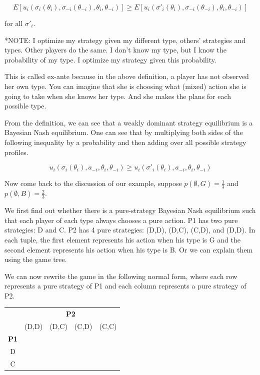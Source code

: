 \documentclass[12pt, oneside]{article}
\begin{document}
\[
E[u_i(\sigma_i(\theta_i), \sigma_{-i}(\theta_{-i}), \theta_i, \theta_{-i})] \geq E[u_i(\sigma'_i(\theta_i), \sigma_{-i}(\theta_{-i}), \theta_i, \theta_{-i})]
\]

for all \( \sigma'_i \).

*NOTE: I optimize my strategy given my different type, others' strategies and types. Other players do the same. I don't know my type, but I know the probability of my type. I optimize my strategy given this probability.

This is called ex-ante because in the above definition, a player has not observed her own type. You can imagine that she is choosing what (mixed) action she is going to take when she knows her type. And she makes the plans for each possible type.

From the definition, we can see that a weakly dominant strategy equilibrium is a Bayesian Nash equilibrium. One can see that by multiplying both sides of the following inequality by a probability and then adding over all possible strategy profiles.

\[
u_i(\sigma_i(\theta_i), a_{-i}, \theta_i, \theta_{-i}) \geq u_i(\sigma'_i(\theta_i), a_{-i}, \theta_i, \theta_{-i})
\]

Now come back to the discussion of our example, suppose \( p(\emptyset, G) = \frac{1}{3} \) and \( p(\emptyset, B) = \frac{2}{3} \).

We first find out whether there is a pure-strategy Bayesian Nash equilibrium such that each player of each type always chooses a pure action. P1 has two pure strategies: D and C. P2 has 4 pure strategies: (D,D), (D,C), (C,D), and (D,D). In each tuple, the first element represents his action when his type is G and the second element represents his action when his type is B. Or we can explain them using the game tree.

We can now rewrite the game in the following normal form, where each row represents a pure strategy of P1 and each column represents a pure strategy of P2.

\begin{table}[h]
    \centering
    \renewcommand{\arraystretch}{1.5}
    \setlength{\tabcolsep}{12pt}
    \begin{tabular}{c|c c c c}
        \multicolumn{1}{c}{} & \multicolumn{4}{c}{\textbf{P2}} \\
        \multicolumn{1}{c}{} & (D,D) & (D,C) & (C,D) & (C,C) \\
        \hline
        \textbf{P1} & & & & \\
        D & & & & \\
        C & & & & \\
    \end{tabular}
\end{table}
\end{document}

